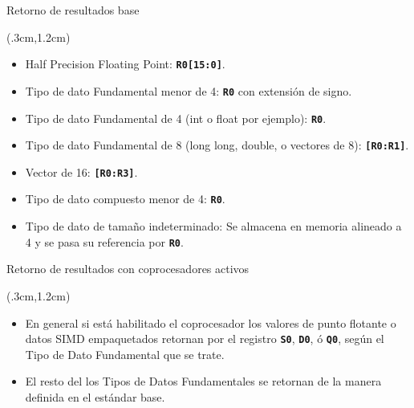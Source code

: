 \documentclass[usenames,table,dvipsnames,aspectratio=169]{beamer}
\begin{document}
\begin{frame}{Retorno de resultados base}
 \begin{textblock*}{\textwidth}(.3cm,1.2cm)
  \begin{itemize}[<+(1)->] \justifying \parskip 0.2cm
   \item Half Precision Floating Point: \textbf{\texttt{R0[15:0]}}.
   \item Tipo de dato Fundamental menor de \SI{4}{\byte}: \textbf{\texttt{R0}} con extensión de signo.
   \item Tipo de dato Fundamental de \SI{4}{\byte} (int o float por ejemplo): \textbf{\texttt{R0}}.
   \item Tipo de dato Fundamental de \SI{8}{\byte} (long long, double, o vectores de \SI{8}{\byte}): \textbf{\texttt{[R0:R1]}}.
   \item Vector de \SI{16}{\byte}: \textbf{\texttt{[R0:R3]}}.
   \item Tipo de dato compuesto menor de \SI{4}{\byte}: \textbf{\texttt{R0}}.
   \item Tipo de dato de tamaño indeterminado: Se almacena en memoria alineado a \SI{4}{\byte} y se pasa su referencia por \textbf{\texttt{R0}}.
  \end{itemize}
 \end{textblock*}
\end{frame}

\begin{frame}{Retorno de resultados con coprocesadores activos}
 \begin{textblock*}{\textwidth}(.3cm,1.2cm) 
  \begin{itemize}[<+(1)->] \justifying \parskip 0.5cm
   \item En general si está habilitado el coprocesador los valores de punto flotante o datos SIMD empaquetados retornan por el registro \textbf{\texttt{S0}}, \textbf{\texttt{D0}}, ó \textbf{\texttt{Q0}}, según el Tipo de Dato Fundamental que se trate.
   \item El resto del los Tipos de Datos Fundamentales se retornan de la manera definida en el estándar base. 
  \end{itemize}
 \end{textblock*}
\end{frame}
\end{document}
